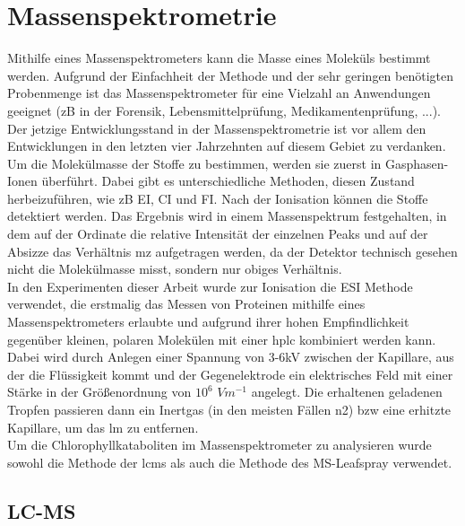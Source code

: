 \section{Massenspektrometrie}

Mithilfe eines Massenspektrometers kann die Masse eines Moleküls bestimmt werden. Aufgrund der Einfachheit der Methode und der sehr geringen benötigten Probenmenge ist das Massenspektrometer für eine Vielzahl an Anwendungen geeignet (\gls{zB} in der Forensik, Lebensmittelprüfung, Medikamentenprüfung, ...). \cite[S. 1]{MassSpectrometry} Der jetzige Entwicklungsstand in der Massenspektrometrie ist vor allem den Entwicklungen in den letzten vier Jahrzehnten auf diesem Gebiet zu verdanken. \cite[S. 6-9]{MassSpectrometry} \\

Um die Molekülmasse der Stoffe zu bestimmen, werden sie zuerst in Gasphasen-Ionen überführt. \cite[S. 15]{MassSpectrometry} Dabei gibt es unterschiedliche Methoden, diesen Zustand herbeizuführen, wie \gls{zB} \gls{EI}, \gls{CI} und \gls{FI}. \cite[S. 15-30]{MassSpectrometry} Nach der Ionisation können die Stoffe detektiert werden. Das Ergebnis wird in einem Massenspektrum festgehalten, in dem auf der Ordinate die relative Intensität der einzelnen Peaks und auf der Absizze das Verhältnis \gls{mz} aufgetragen werden, da der Detektor technisch gesehen nicht die Molekülmasse misst, sondern nur obiges Verhältnis. \\

In den Experimenten dieser Arbeit wurde zur Ionisation die \gls{ESI} Methode verwendet, die erstmalig das Messen von Proteinen mithilfe eines Massenspektrometers erlaubte und aufgrund ihrer hohen Empfindlichkeit gegenüber kleinen, polaren Molekülen mit einer \gls{hplc} kombiniert werden kann. Dabei wird durch Anlegen einer Spannung von 3-6kV zwischen der Kapillare, aus der die Flüssigkeit kommt und der Gegenelektrode ein elektrisches Feld mit einer Stärke in der Größenordnung von $10^{6}$ $Vm^{-1}$ angelegt. Die erhaltenen geladenen Tropfen passieren dann ein Inertgas (in den meisten Fällen \gls{n2}) \gls{bzw} eine erhitzte Kapillare, um das \gls{lm} zu entfernen. \cite[S. 43-44]{MassSpectrometry} \\

Um die Chlorophyllkataboliten im Massenspektrometer zu analysieren wurde sowohl die Methode der \gls{lcms} als auch die Methode des MS-Leafspray verwendet. 

\subsection{LC-MS}

